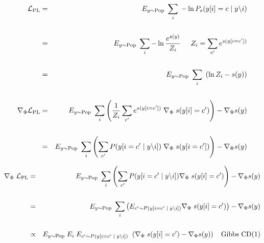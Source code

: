 {{\huge
\begin{eqnarray*}
{\cal L}_{\mathrm{PL}} & = & E_{y \sim \mathrm{Pop}}\;\sum_i \; - \ln P_s(y[i]=c\;|\;y\backslash i) \\
\\
 & = & E_{y \sim \mathrm{Pop}}\;\sum_i -\ln \frac{e^{s(y)}}{Z_i}\;\;\;\;\;{Z_i = \sum_{c'} e^{s(y[i=c'])}} \\
\\
& = & E_{y \sim \mathrm{Pop}}\;\sum_i\; \left(\ln Z_i - s(y)\right) \\
\\
\nabla_\Phi {\cal L}_{\mathrm{PL}} & = & E_{y \sim \mathrm{Pop}}\;\sum_i \left(\frac{1}{Z_i} \sum_{c'} e^{s(y[i=c'])} \; \nabla_\Phi\;s(y[i]=c')\right) - \nabla_\Phi s(y) \\
\\
& = & E_{y \sim \mathrm{Pop}}\;\sum_i \left(\sum_{c'} P(y[i=c'\;|\;y\backslash i]) \; \nabla_\Phi\;s(y[i=c'])\right) - \nabla_\Phi s(y)
\end{eqnarray*}
}


{\huge
\begin{eqnarray*}
\nabla_\Phi\;{\cal L}_{\mathrm{PL}} & = & E_{y \sim \mathrm{Pop}}\;\sum_i \left(\sum_{c'} P(y[i=c'\;|\;y\backslash i]) \nabla_\Phi\;s(y[i]=c')\right) - \nabla_\Phi s(y) \\
\\
& = & E_{y \sim \mathrm{Pop}}\;\sum_i \left(E_{c' \sim P(y[i=c'\;|\;y\backslash i])} \nabla_\Phi\;s(y[i]=c')\right) - \nabla_\Phi s(y) \\
\\
& \propto & E_{y \sim \mathrm{Pop}}\;E_i\; E_{c' \sim P(y[i=c'\;|\;y\backslash i])}\;\; (\nabla_\Phi\;s(y[i]=c') - \nabla_\Phi s(y))\;\;\;\;\mbox{Gibbs CD(1)}
\end{eqnarray*}
}

}

